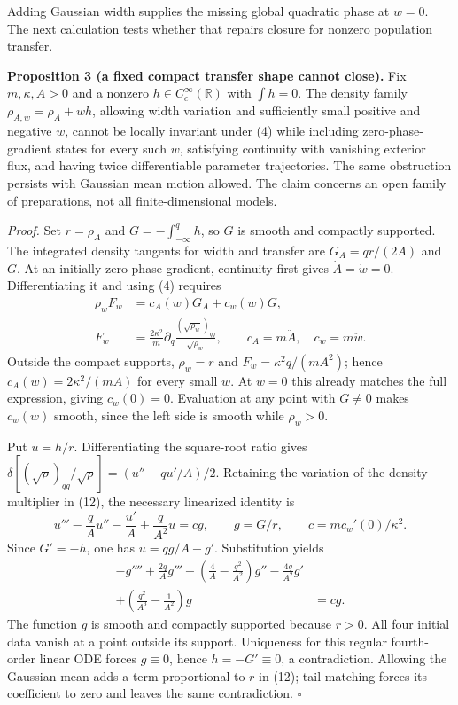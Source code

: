 \documentclass[11pt,a4paper]{article}
\begin{document}
Adding Gaussian width supplies the missing global quadratic phase at
\(w=0\). The next calculation tests whether that repairs closure for
nonzero population transfer.

\textbf{Proposition 3 (a fixed compact transfer shape cannot close).}
Fix \(m,\kappa,A>0\) and a nonzero \(h\in C_c^\infty(\mathbb R)\) with
\(\int h=0\). The density family \(\rho_{A,w}=\rho_A+wh\), allowing
width variation and sufficiently small positive and negative \(w\),
cannot be locally invariant under (4) while including
zero-phase-gradient states for every such \(w\), satisfying continuity
with vanishing exterior flux, and having twice differentiable parameter
trajectories. The same obstruction persists with Gaussian mean motion
allowed. The claim concerns an open family of preparations, not all
finite-dimensional models.

\emph{Proof.} Set \(r=\rho_A\) and \(G=-\int_{-\infty}^q h\), so \(G\)
is smooth and compactly supported. The integrated density tangents for
width and transfer are \(G_A=qr/(2A)\) and \(G\). At an initially zero
phase gradient, continuity first gives \(\dot A=\dot w=0\).
Differentiating it and using (4) requires \[\begin{aligned}
\rho_wF_w&=c_A(w)G_A+c_w(w)G,\\
F_w&=\frac{2\kappa^2}{m}\partial_q
      \frac{(\sqrt{\rho_w})_{qq}}{\sqrt{\rho_w}},
\qquad c_A=m\ddot A,\quad c_w=m\ddot w.
\end{aligned}\tag{12}\] Outside the compact supports, \(\rho_w=r\) and
\(F_w=\kappa^2q/(mA^2)\); hence \(c_A(w)=2\kappa^2/(mA)\) for every
small \(w\). At \(w=0\) this already matches the full expression, giving
\(c_w(0)=0\). Evaluation at any point with \(G\ne0\) makes \(c_w(w)\)
smooth, since the left side is smooth while \(\rho_w>0\).

Put \(u=h/r\). Differentiating the square-root ratio gives
\(\delta[(\sqrt\rho)_{qq}/\sqrt\rho] =(u''-qu'/A)/2\). Retaining the
variation of the density multiplier in (12), the necessary linearized
identity is \[u'''-\frac qA u''-\frac{u'}A+\frac q{A^2}u=cg,
\qquad g=G/r,\qquad c=mc_w'(0)/\kappa^2.\tag{13}\] Since \(G'=-h\), one
has \(u=qg/A-g'\). Substitution yields \[\begin{aligned}
-g''''+\frac{2q}{A}g'''
 +\left(\frac4A-\frac{q^2}{A^2}\right)g''
 -\frac{4q}{A^2}g'\\
 +\left(\frac{q^2}{A^3}-\frac1{A^2}\right)g&=cg.
\end{aligned}\tag{14}\] The function \(g\) is smooth and compactly
supported because \(r>0\). All four initial data vanish at a point
outside its support. Uniqueness for this regular fourth-order linear ODE
forces \(g\equiv0\), hence \(h=-G'\equiv0\), a contradiction. Allowing
the Gaussian mean adds a term proportional to \(r\) in (12); tail
matching forces its coefficient to zero and leaves the same
contradiction. \(\square\)
\end{document}

